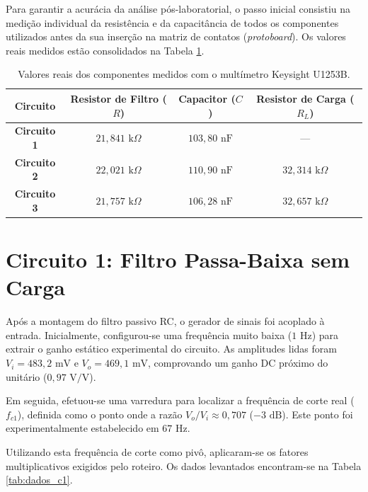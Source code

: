 Para garantir a acurácia da análise pós-laboratorial, o passo inicial consistiu na medição individual da resistência e da capacitância de todos os componentes utilizados antes da sua inserção na matriz de contatos (\textit{protoboard}). Os valores reais medidos estão consolidados na Tabela \ref{tab:componentes_medidos}.

\begin{table}[H]
	\centering
	\caption{Valores reais dos componentes medidos com o multímetro Keysight U1253B.}
	\label{tab:componentes_medidos}
	\renewcommand{\arraystretch}{1.2}
	\begin{tabular}{cccc}
		\hline
		\textbf{Circuito} & \textbf{Resistor de Filtro ($R$)} & \textbf{Capacitor ($C$)} & \textbf{Resistor de Carga ($R_L$)} \\ \hline
		\textbf{Circuito 1} & $21,841\text{ k}\Omega$ & $103,80\text{ nF}$ & — \\
		\textbf{Circuito 2} & $22,021\text{ k}\Omega$ & $110,90\text{ nF}$ & $32,314\text{ k}\Omega$ \\
		\textbf{Circuito 3} & $21,757\text{ k}\Omega$ & $106,28\text{ nF}$ & $32,657\text{ k}\Omega$ \\ \hline
	\end{tabular}
\end{table}

\section{Circuito 1: Filtro Passa-Baixa sem Carga}

Após a montagem do filtro passivo RC, o gerador de sinais foi acoplado à entrada. Inicialmente, configurou-se uma frequência muito baixa ($1\text{ Hz}$) para extrair o ganho estático experimental do circuito. As amplitudes lidas foram $V_i = 483,2\text{ mV}$ e $V_o = 469,1\text{ mV}$, comprovando um ganho DC próximo do unitário ($0,97\text{ V/V}$).

Em seguida, efetuou-se uma varredura para localizar a frequência de corte real ($f_{c1}$), definida como o ponto onde a razão $V_o/V_i \approx 0,707$ ($-3\text{ dB}$). Este ponto foi experimentalmente estabelecido em \textbf{$67\text{ Hz}$}. 

Utilizando esta frequência de corte como pivô, aplicaram-se os fatores multiplicativos exigidos pelo roteiro. Os dados levantados encontram-se na Tabela \ref{tab:dados_c1}.

